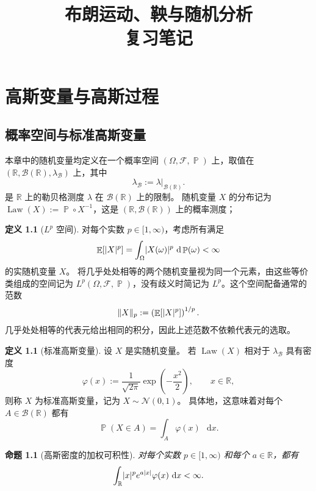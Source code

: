 \documentclass[UTF8,11pt,a4paper,oneside,fontset=fandol]{ctexrep}
\title{布朗运动、鞅与随机分析\\复习笔记}
\author{}
\date{}
\numberwithin{equation}{section}
\theoremstyle{plain}
\newtheorem{proposition}[theorem]{命题}
\theoremstyle{definition}
\newtheorem{definition}[theorem]{定义}
\theoremstyle{remark}
\newcommand{\R}{\mathbb{R}}
\newcommand{\B}{\mathcal{B}}
\newcommand{\F}{\mathcal{F}}
\DeclareMathOperator{\Prob}{\mathbb{P}}
\DeclareMathOperator{\E}{\mathbb{E}}
\DeclareMathOperator{\Law}{Law}
\newcommand{\dd}{\mathop{}\!\mathrm{d}}
\DeclarePairedDelimiter{\abs}{\lvert}{\rvert}
\DeclarePairedDelimiter{\norm}{\lVert}{\rVert}
\begin{document}
\maketitle

\tableofcontents
\clearpage
{}

\chapter{高斯变量与高斯过程}
\section{概率空间与标准高斯变量}
\label{sec:standard-gaussian}
本章中的随机变量均定义在一个概率空间 $(\Omega,\F,\Prob)$ 上，取值在 $(\R,\B(\R),\lambda_{\B})$ 上，其中 
\[
  \lambda_{\B}:=\lambda|_{\B(\R)}.
\]
是 $\R$ 上的勒贝格测度 $\lambda$ 在 $\B(\R)$ 上的限制。
随机变量 $X$ 的分布记为 $\Law(X):=\Prob\circ X^{-1}$，这是 $(\R,\B(\R))$ 上的概率测度；

\begin{definition}[$L^p$ 空间]
\label{def:lp}
对每个实数 $p\in[1,\infty)$，考虑所有满足
\[
  \E\!\left[\abs{X}^{p}\right]
  =\int_\Omega \abs{X(\omega)}^{p}\,\dd\Prob(\omega)<\infty
\]
的实随机变量 $X$。
将几乎处处相等的两个随机变量视为同一个元素，由这些等价类组成的空间记为 $L^p(\Omega,\F,\Prob)$，没有歧义时简记为
$L^p$。这个空间配备通常的范数
\[
  \norm{X}_p
  :=\left(\E\!\left[\abs{X}^{p}\right]\right)^{1/p}.
\]
几乎处处相等的代表元给出相同的积分，因此上述范数不依赖代表元的选取。
\end{definition}

\begin{definition}[标准高斯变量]
\label{def:standard-gaussian}
设 $X$ 是实随机变量。
若 $\Law(X)$ 相对于 $\lambda_{\B}$ 具有密度
\[
  \varphi(x)
  :=\frac{1}{\sqrt{2\pi}}\exp\!\left(-\frac{x^2}{2}\right),
  \qquad x\in\R,
\]
则称 $X$ 为标准高斯变量，记为
$X\sim\mathcal{N}(0,1)$。
具体地，这意味着对每个 $A\in\B(\R)$ 都有
\[
  \Prob(X\in A)=\int_A\varphi(x)\,\dd x.
\]
\end{definition}

\begin{proposition}[高斯密度的加权可积性]
\label{prop:gaussian-integrability}
对每个实数 $p\in[1,\infty)$ 和每个 $a\in\R$，都有
\[
  \int_{\R}\abs{x}^{p}e^{a\abs{x}}\varphi(x)\,\dd x<\infty.
\]
\end{proposition}
\end{document}
